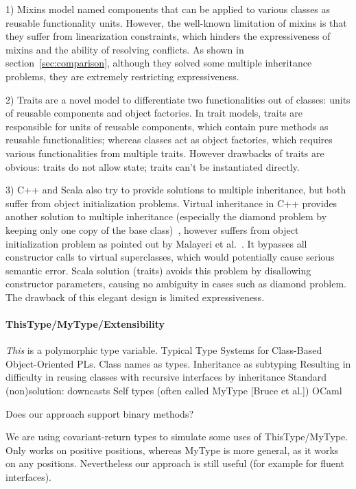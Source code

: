 1) Mixins model named components that can be applied to various classes as
reusable functionality units. However, the well-known limitation of mixins is
that they suffer from linearization constraints, which hinders the
expressiveness of mixins and the ability of resolving conflicts.  As shown in
section~\ref{sec:comparison}, although they solved some multiple inheritance
problems, they are extremely restricting expressiveness. 

2) Traits are a novel model to differentiate two functionalities out of classes:
units of reusable components and object factories. In trait models, traits are
responsible for units of reusable components, which contain pure methods as
reusable functionalities; whereas classes act as object factories, which
requires various functionalities from multiple traits. However drawbacks of
traits are obvious: traits do not allow state; traits can't be instantiated
directly.

3) C++ and Scala also try to provide solutions to multiple inheritance, but both
suffer from object initialization problems. Virtual inheritance in C++ provides
another solution to multiple inheritance (especially the diamond problem by
keeping only one copy of the base class)~\cite{ellis1990annotated}, however
suffers from object initialization problem as pointed out by Malayeri et
al.~\cite{malayeri2009cz}. It bypasses all constructor calls to virtual
superclasses, which would potentially cause serious semantic error. Scala
solution (traits) avoids this problem by disallowing constructor parameters,
causing no ambiguity in cases such as diamond problem. The drawback of this
elegant design is limited expressiveness. 

\paragraph{ThisType/MyType/Extensibility}
\emph{This} is a polymorphic type variable.  Typical Type Systems
forClass-Based Object-Oriented PLs. Class names as types.  Inheritance as
subtyping Resulting in difficulty in reusing classes with recursive interfaces
by inheritance Standard (non)solution: downcasts Self types (often called MyType
[Bruce et al.])  OCaml

Does our approach support binary methods?





We are using covariant-return types to simulate some uses 
of ThisType/MyType. Only works on positive positions, whereas 
MyType is more general, as it works on any positions. Nevertheless 
our approach is still useful (for example for fluent interfaces). 

